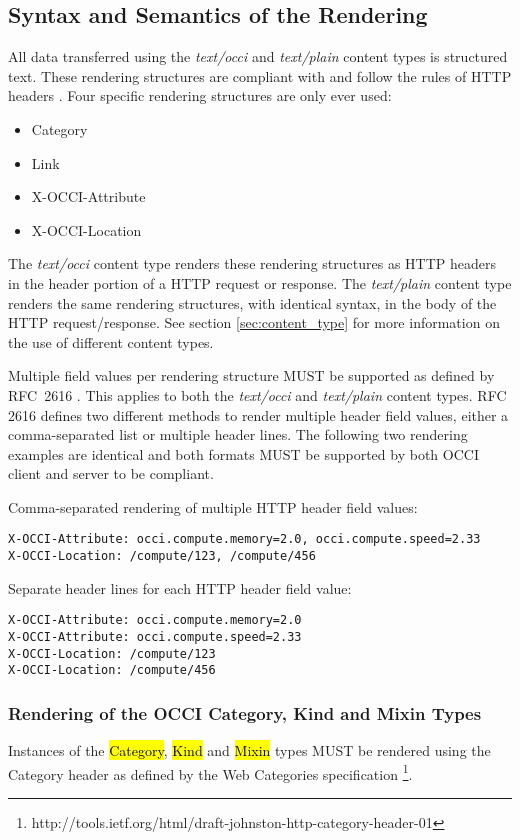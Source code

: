\documentclass[10pt,a4paper]{article}
\begin{document}
\subsection{Syntax and Semantics of the Rendering}
\label{sec:syntax}
All data transferred using the \textit{text/occi} and
\textit{text/plain} content types is structured text. These rendering
structures are compliant with and follow the rules of HTTP headers
\cite{rfc2616}.  Four specific rendering structures are only ever used:

\begin{itemize}
  \item Category
  \item Link
  \item X-OCCI-Attribute
  \item X-OCCI-Location
\end{itemize}

The \textit{text/occi} content type renders these rendering structures
as HTTP headers in the header portion of a HTTP request or
response. The \textit{text/plain} content type renders the same
rendering structures, with identical syntax, in the body of the HTTP
request/response. See section \ref{sec:content_type} for more
information on the use of different content types.

Multiple field values per rendering structure MUST be supported as
defined by RFC~2616 \cite{rfc2616}. This applies to both the
\textit{text/occi} and \textit{text/plain} content types. RFC 2616
defines two different methods to render multiple header field values,
either a comma-separated list or multiple header lines. The following
two rendering examples are identical and both formats MUST be
supported by both OCCI client and server to be compliant.

Comma-separated rendering of multiple HTTP header field values:

\begin{verbatim}
X-OCCI-Attribute: occi.compute.memory=2.0, occi.compute.speed=2.33
X-OCCI-Location: /compute/123, /compute/456
\end{verbatim}

Separate header lines for each HTTP header field value:
\begin{verbatim}
X-OCCI-Attribute: occi.compute.memory=2.0
X-OCCI-Attribute: occi.compute.speed=2.33
X-OCCI-Location: /compute/123
X-OCCI-Location: /compute/456
\end{verbatim}

\subsubsection{Rendering of the OCCI Category, Kind and Mixin Types}
\label{sec:render_cats}
Instances of the \hl{Category}, \hl{Kind} and \hl{Mixin} types
\cite{occi:core} MUST be rendered using the Category header as defined
by the Web Categories specification%
\footnote{http://tools.ietf.org/html/draft-johnston-http-category-header-01}.
\end{document}
